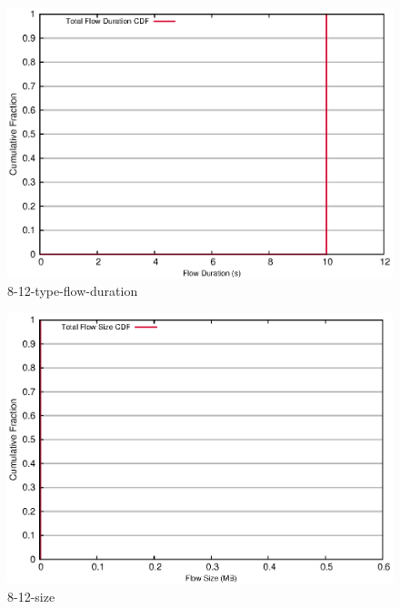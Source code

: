 \documentclass[landscape]{article}
\begin{document}

\begin{figure}[!hbt]
\centering
\includegraphics[width=1\textwidth]{8-12-type-flow-duration.eps}
\caption{8-12-type-flow-duration}
\end{figure}


\newpage

\begin{figure}[!hbt]
\centering
\includegraphics[width=1\textwidth]{8_12_type_flow_size.eps}
\caption{8-12-size}
\end{figure}


\newpage
\end{document}
